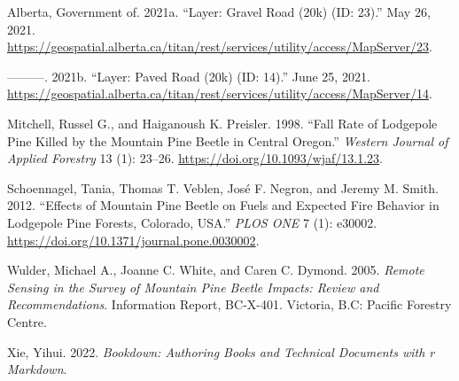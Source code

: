 \documentclass[
]{article}
\newlength{\cslhangindent}
\newlength{\cslentryspacingunit} %
\newenvironment{CSLReferences}[2] %
 {%
  \setlength{\parindent}{0pt}
  \ifodd #1
  \let\oldpar\par
  \def\par{\hangindent=\cslhangindent\oldpar}
  \fi
  \setlength{\parskip}{#2\cslentryspacingunit}
 }%
 {}
\begin{document}
\hypertarget{refs}{}
\begin{CSLReferences}{1}{0}
\leavevmode{}%
Alberta, Government of. 2021a. {``Layer: {Gravel Road} ({20k}) ({ID}: 23).''} May 26, 2021. \url{https://geospatial.alberta.ca/titan/rest/services/utility/access/MapServer/23}.

\leavevmode{}%
---------. 2021b. {``Layer: {Paved Road} ({20k}) ({ID}: 14).''} June 25, 2021. \url{https://geospatial.alberta.ca/titan/rest/services/utility/access/MapServer/14}.

\leavevmode{}%
Mitchell, Russel G., and Haiganoush K. Preisler. 1998. {``Fall {Rate} of {Lodgepole Pine Killed} by the {Mountain Pine Beetle} in {Central Oregon}.''} \emph{Western Journal of Applied Forestry} 13 (1): 23--26. \url{https://doi.org/10.1093/wjaf/13.1.23}.

\leavevmode{}%
Schoennagel, Tania, Thomas T. Veblen, José F. Negron, and Jeremy M. Smith. 2012. {``Effects of {Mountain Pine Beetle} on {Fuels} and {Expected Fire Behavior} in {Lodgepole Pine Forests}, {Colorado}, {USA}.''} \emph{PLOS ONE} 7 (1): e30002. \url{https://doi.org/10.1371/journal.pone.0030002}.

\leavevmode{}%
Wulder, Michael A., Joanne C. White, and Caren C. Dymond. 2005. \emph{Remote Sensing in the Survey of Mountain Pine Beetle Impacts: Review and Recommendations}. Information Report, BC-X-401. {Victoria, B.C}: {Pacific Forestry Centre}.

\leavevmode{}%
Xie, Yihui. 2022. \emph{Bookdown: Authoring Books and Technical Documents with r Markdown}.

\end{CSLReferences}
\end{document}
